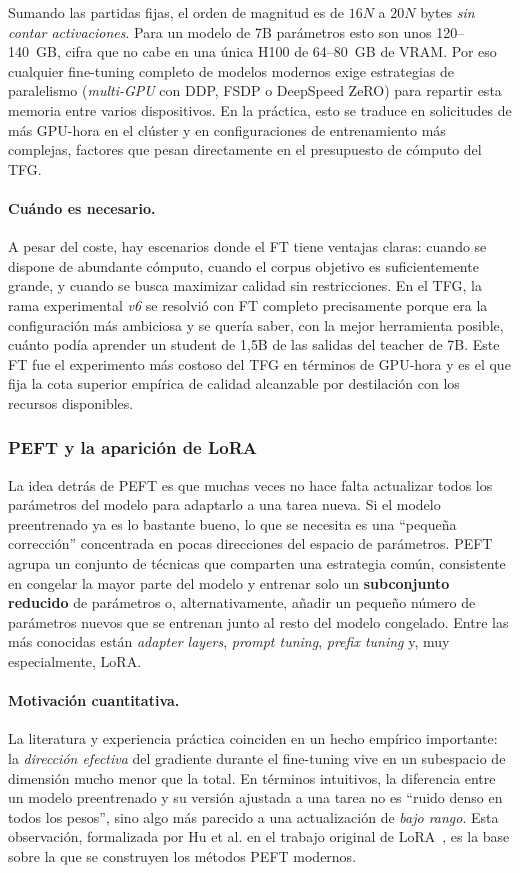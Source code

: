 \documentclass[11pt,a4paper]{article}
\begin{document}
Sumando las partidas fijas, el orden de magnitud es de $16N$ a $20N$ bytes \emph{sin contar activaciones}. Para un modelo de 7B parámetros esto son unos 120--140~GB, cifra que no cabe en una única H100 de 64--80~GB de VRAM. Por eso cualquier fine-tuning completo de modelos modernos exige estrategias de paralelismo (\textit{multi-GPU} con DDP, FSDP o DeepSpeed ZeRO) para repartir esta memoria entre varios dispositivos. En la práctica, esto se traduce en solicitudes de más GPU-hora en el clúster y en configuraciones de entrenamiento más complejas, factores que pesan directamente en el presupuesto de cómputo del TFG.

\paragraph{Cuándo es necesario.} A pesar del coste, hay escenarios donde el FT tiene ventajas claras: cuando se dispone de abundante cómputo, cuando el corpus objetivo es suficientemente grande, y cuando se busca maximizar calidad sin restricciones. En el TFG, la rama experimental \textit{v6} se resolvió con FT completo precisamente porque era la configuración más ambiciosa y se quería saber, con la mejor herramienta posible, cuánto podía aprender un student de 1{,}5B de las salidas del teacher de 7B. Este FT fue el experimento más costoso del TFG en términos de GPU-hora y es el que fija la cota superior empírica de calidad alcanzable por destilación con los recursos disponibles.

\subsubsection{PEFT y la aparición de LoRA}

La idea detrás de PEFT es que muchas veces no hace falta actualizar todos los parámetros del modelo para adaptarlo a una tarea nueva. Si el modelo preentrenado ya es lo bastante bueno, lo que se necesita es una ``pequeña corrección'' concentrada en pocas direcciones del espacio de parámetros. PEFT agrupa un conjunto de técnicas que comparten una estrategia común, consistente en congelar la mayor parte del modelo y entrenar solo un \textbf{subconjunto reducido} de parámetros o, alternativamente, añadir un pequeño número de parámetros nuevos que se entrenan junto al resto del modelo congelado. Entre las más conocidas están \textit{adapter layers}, \textit{prompt tuning}, \textit{prefix tuning} y, muy especialmente, LoRA.

\paragraph{Motivación cuantitativa.} La literatura y experiencia práctica coinciden en un hecho empírico importante: la \emph{dirección efectiva} del gradiente durante el fine-tuning vive en un subespacio de dimensión mucho menor que la total. En términos intuitivos, la diferencia entre un modelo preentrenado y su versión ajustada a una tarea no es ``ruido denso en todos los pesos'', sino algo más parecido a una actualización de \emph{bajo rango}. Esta observación, formalizada por Hu et al. en el trabajo original de LoRA~\cite{hu2021lora}, es la base sobre la que se construyen los métodos PEFT modernos.
\end{document}
